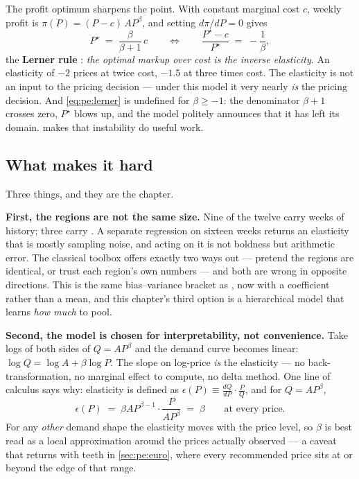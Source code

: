 The profit optimum sharpens the point. With constant marginal cost $c$, weekly profit is
$\pi(P) = (P-c)\,A P^{\beta}$, and setting $d\pi/dP = 0$ gives
%
\begin{equation}
  P^\star \;=\; \frac{\beta}{\beta+1}\,c
  \qquad\Longleftrightarrow\qquad
  \frac{P^\star - c}{P^\star} \;=\; -\frac{1}{\beta},
  \label{eq:pe:lerner}
\end{equation}
%
the \textbf{Lerner rule} \citep{lerner1934}: \emph{the optimal markup over cost is the inverse
elasticity}. An elasticity of $-2$ prices at twice cost, $-1.5$ at three times cost. The
elasticity is not an input to the pricing decision --- under this model it very nearly \emph{is}
the pricing decision. And \cref{eq:pe:lerner} is undefined for $\beta \ge -1$: the denominator
$\beta + 1$ crosses zero, $P^\star$ blows up, and the model politely announces that it has left
its domain.  makes that instability do useful work.

\subsection*{What makes it hard}

Three things, and they are the chapter.

\textbf{First, the regions are not the same size.} Nine of the twelve carry \nbThreeObsMax{} weeks
of history; three carry \nbThreeObsMin{}. A separate regression on sixteen weeks returns an
elasticity that is mostly sampling noise, and acting on it is not boldness but arithmetic error.
The classical toolbox offers exactly two ways out --- pretend the regions are identical, or trust
each region's own numbers --- and both are wrong in opposite directions. This is the same
bias--variance bracket as , now with a coefficient rather than a mean, and this
chapter's third option is a hierarchical model that learns \emph{how much} to pool.

\textbf{Second, the model is chosen for interpretability, not convenience.} Take logs of both
sides of $Q = A P^{\beta}$ and the demand curve becomes linear:
$\log Q = \log A + \beta \log P$. The slope on log-price \emph{is} the elasticity --- no
back-transformation, no marginal effect to compute, no delta method. One line of calculus says
why: elasticity is defined as $\epsilon(P) \equiv \frac{dQ}{dP}\cdot\frac{P}{Q}$, and for
$Q = A P^{\beta}$,
%
\begin{equation}
  \epsilon(P) \;=\; \beta A P^{\beta - 1} \cdot \frac{P}{A P^{\beta}} \;=\; \beta
  \qquad \text{at every price.}
  \label{eq:pe:elast}
\end{equation}
%
For any \emph{other} demand shape the elasticity moves with the price level, so $\beta$ is best
read as a local approximation around the prices actually observed --- a caveat that returns with
teeth in \cref{sec:pe:euro}, where every recommended price sits at or beyond the edge of that
range.


